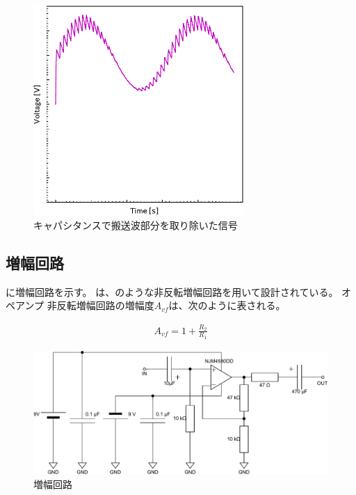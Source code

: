 \documentclass[report.tex]{subfiles}
\begin{document}
\begin{figure}[H]
	\centering
	\includegraphics[width=8cm]{fig/capa.pdf}
	\caption{キャパシタンスで搬送波部分を取り除いた信号}
	\label{fig:capa}
\end{figure}

\subsection{増幅回路}

に増幅回路を示す。
は、のような非反転増幅回路を用いて設計されている。
オペアンプ
非反転増幅回路の増幅度\(A_{vf}\)は、次のように表される。

\begin{align}
	A_{vf} = 1 + \frac{R_2}{R_1}
\end{align}

\begin{figure}[H]
	\centering
	\includegraphics[width=15cm]{fig/amp.pdf}
	\caption{増幅回路}
	\label{fig:amplifier-circuit}
\end{figure}
\end{document}
